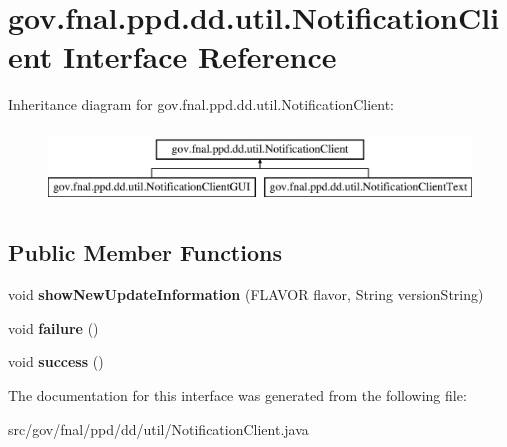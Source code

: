 \hypertarget{interfacegov_1_1fnal_1_1ppd_1_1dd_1_1util_1_1NotificationClient}{\section{gov.\-fnal.\-ppd.\-dd.\-util.\-Notification\-Client Interface Reference}
\label{interfacegov_1_1fnal_1_1ppd_1_1dd_1_1util_1_1NotificationClient}
}
Inheritance diagram for gov.\-fnal.\-ppd.\-dd.\-util.\-Notification\-Client\-:\begin{figure}[H]
\begin{center}
\leavevmode
\includegraphics[height=2.000000cm]{interfacegov_1_1fnal_1_1ppd_1_1dd_1_1util_1_1NotificationClient}
\end{center}
\end{figure}
\subsection*{Public Member Functions}
\begin{DoxyCompactItemize}
\item 
\hypertarget{interfacegov_1_1fnal_1_1ppd_1_1dd_1_1util_1_1NotificationClient_ad60ec28400496066ca3e3fd07245f2b7}{void {\bfseries show\-New\-Update\-Information} (F\-L\-A\-V\-O\-R flavor, String version\-String)}\label{interfacegov_1_1fnal_1_1ppd_1_1dd_1_1util_1_1NotificationClient_ad60ec28400496066ca3e3fd07245f2b7}

\item 
\hypertarget{interfacegov_1_1fnal_1_1ppd_1_1dd_1_1util_1_1NotificationClient_a098fe6b3d1b1f9e44fe616b3fab6ef21}{void {\bfseries failure} ()}\label{interfacegov_1_1fnal_1_1ppd_1_1dd_1_1util_1_1NotificationClient_a098fe6b3d1b1f9e44fe616b3fab6ef21}

\item 
\hypertarget{interfacegov_1_1fnal_1_1ppd_1_1dd_1_1util_1_1NotificationClient_a9958abd14c8e1b50015a07944a139051}{void {\bfseries success} ()}\label{interfacegov_1_1fnal_1_1ppd_1_1dd_1_1util_1_1NotificationClient_a9958abd14c8e1b50015a07944a139051}

\end{DoxyCompactItemize}


The documentation for this interface was generated from the following file\-:\begin{DoxyCompactItemize}
\item 
src/gov/fnal/ppd/dd/util/Notification\-Client.\-java\end{DoxyCompactItemize}
